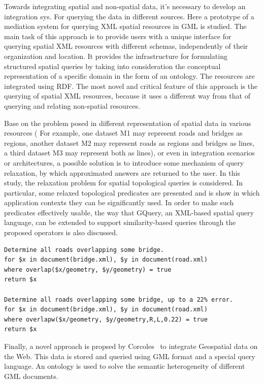 \documentclass[a4paper,12pt]{article}
\begin{document}
\cite{corcoles2004} Towards integrating spatial and non-spatial data, it's necessary to develop an integration sys. For querying the data in different sources. Here a prototype of a mediation system for querying XML spatial resources in GML is studied.  The main task of this approach is to provide users with a unique interface for querying spatial XML resources with different schemas, independently of their organization and location. It provides the infrastructure for formulating structured spatial queries by taking into consideration the conceptual representation of a specific domain in the form of an ontology. The resources are integrated using RDF. The most novel and critical feature of this approach is the querying of spatial XML resources, because it uses a different way from that of querying and relating non-spatial resources.

\cite{belussi2006} Base on the problem posed in different representation of spatial data in various resources ( For example, one dataset M1 may represent roads and bridges as regions, another dataset M2 may represent roads as regions and bridges as lines, a third dataset M3 may represent both as lines), or even in integration scenarios or architectures, a possible solution is to introduce some mechanism of query relaxation, by which approximated answers are returned to the user. In this study, the relaxation problem for spatial topological queries is considered. In particular,  some relaxed topological predicates are presented and is show in which application contexts they can be significantly used. In order to make such predicates effectively usable, the way that GQuery, an XML-based spatial query language, can be extended to support similarity-based queries through the proposed operators is also discussed.

\begin{verbatim}
Determine all roads overlapping some bridge.
for $x in document(bridge.xml), $y in document(road.xml)
where overlap($x/geometry, $y/geometry) = true
return $x

Determine all roads overlapping some bridge, up to a 22% error.
for $x in document(bridge.xml), $y in document(road.xml)
where overlapw($x/geometry, $y/geometry,R,L,0.22) = true
return $x 
\end{verbatim}

Finally, a novel approach is propsed by Corcoles~\cite{corcoles2003} to integrate Geospatial data on the Web.
This data is stored and queried using GML format and a special query language. 
An ontology is used to solve the semantic heterogeneity of different GML documents.
\end{document}
